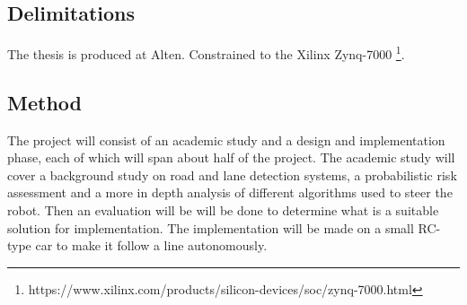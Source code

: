 \subsection{Delimitations}
The thesis is produced at Alten.
Constrained to the Xilinx Zynq-7000 \footnote{https://www.xilinx.com/products/silicon-devices/soc/zynq-7000.html}.

\subsection{Method}
The project will consist of an academic study and a design and implementation phase, each of which will span about half of the project. The academic study will cover a background study on road and lane detection systems, a probabilistic risk assessment and a more in depth analysis of different algorithms used to steer the robot. Then an evaluation will be will be done to determine what is a suitable solution for implementation. The implementation will be made on a small RC-type car to make it follow a line autonomously.